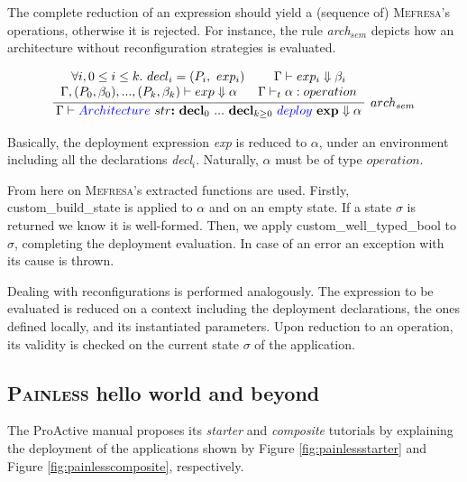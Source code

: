 				The complete reduction of an expression should yield a (sequence of) \textsc{Mefresa}'s \textsf{operation}s,
			otherwise it is rejected. For instance, the rule \textit{arch$_{sem}$} depicts how an architecture without
			reconfiguration strategies is evaluated.
			
			$$
\infer[arch_{sem}]{\env \vdash \blue{Architecture} \ str \textbf{:} \ \textbf{decl}_0 \ ... \ \textbf{decl}_{k\geq 0} \ \blue{deploy} \ \textbf{exp}  \Downarrow \alpha}
{  \begin{tabular}{ c } 
		$\forall i, 0 \leq i \leq k. \ decl_i = (P_i, \ exp_i)$ \ \ \ \ \ \ $\env \vdash exp_i \Downarrow \beta_i$\\
       $\env, (P_0, \beta_0), ..., (P_k, \beta_k) \vdash exp \Downarrow \alpha$ \ \ \ \ $\env \vdash_t \alpha : operation$
	\end{tabular}} 
$$

	\noindent Basically, the deployment expression \textit{exp} is reduced to $\alpha$, under an environment including
	all the declarations \textit{decl$_i$}. Naturally, $\alpha$ must be of type $operation$. 
	
	From here on \textsc{Mefresa}'s extracted  functions are used. Firstly,
	\textsf{custom\_build\_state} is applied to $\alpha$ and on an empty \textsf{state}. If a \textsf{state} $\sigma$
	is returned we know it is well-formed. Then, we apply \textsf{custom\_well\_typed\_bool} to $\sigma$,
	completing the deployment evaluation. In case of an error an exception with its cause is thrown. 
	
	Dealing with reconfigurations is performed analogously. The expression to be evaluated is reduced on a context including
	the deployment declarations, the ones defined locally, and its instantiated parameters. 
	Upon reduction to an \textsf{operation}, its validity is checked on the current \textsf{state} $\sigma$ of the application.
	
		
		
\subsection{\textsc{Painless} hello world and beyond}		
\label{sub:hello}	

	 The ProActive manual proposes its \textit{starter} and \textit{composite}
	 tutorials by explaining the deployment of the applications shown by Figure \ref{fig:painlessstarter} and
	 Figure \ref{fig:painlesscomposite}, respectively.
	 

